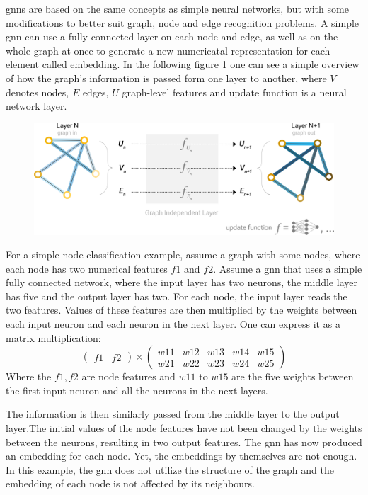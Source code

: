 \gls{gnn}s are based on the same concepts as simple neural networks, but with some modifications to better suit graph, node and edge recognition problems. A simple \gls{gnn} can use a fully connected layer on each node and edge, as well as on the whole graph at once to generate a new numericatal representation for each element called embedding. In the following figure \ref{GNN example} one can see a simple overview of how the graph's information is passed form one layer to another, where $V$ denotes nodes, $E$ edges, $U$ graph-level features and update function is a neural network layer.

\begin{figure}[H]
    \centering
    \includegraphics[scale=0.8]{figures/gnnintro}
    \label{GNN example}
\end{figure}

For a simple node classification example, assume a graph with some nodes, where each node has two numerical features $f1$ and $f2$. Assume a \gls{gnn} that uses a simple fully connected network, where the input layer has two neurons, the middle layer has five and the output layer has two. For each node, the input layer reads the two features. Values of these features are then multiplied by the weights between each input neuron and each neuron in the next layer. One can express it as a matrix multiplication: 
$$
\begin{pmatrix}
f1 & f2 
\end{pmatrix}	
\times
\begin{pmatrix}
w11 & w12 & w13 & w14 & w15 \\
w21 & w22 & w23 & w24 & w25
\end{pmatrix}	
 $$ Where the $f1, f2$ are node features and $w11$ to $w15$ are the five weights between the first input neuron and all the neurons in the next layers.

The information is then similarly passed from the middle layer to the output layer.The initial values of the node features have not been changed by the weights between the neurons, resulting in two output features. The \gls{gnn} has now produced an embedding for each node. Yet, the embeddings by themselves are not enough. In this example, the \gls{gnn} does not utilize the structure of the graph and the embedding of each node is not affected by its neighbours. 


